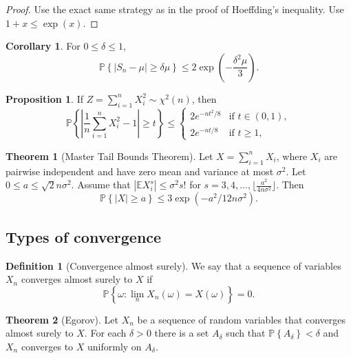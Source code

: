\documentclass{article}
\theoremstyle{definition}
\newtheorem{theorem}{Theorem}[section]
\newtheorem{definition}{Definition}[section]
\newtheorem{proposition}{Proposition}[section]
\newtheorem{corollary}{Corollary}[section]
\begin{document}
  \begin{proof}
    Use the exact same strategy as in the proof of Hoeffding's inequality. Use
    \( 1 + x \leq \exp\left(x\right)\).
  \end{proof}

  \begin{corollary}
    For \( 0 \leq \delta \leq 1 \),
    \[
      \mathbb{P}\left\{ \left| S_n - \mu \right| \geq \delta \mu
      \right\} \leq 2 \exp\left(- \frac{\delta^2 \mu}{3}\right).
    \]
  \end{corollary}

  \begin{proposition}
    If \( Z = \sum_{i=1}^{n} X_{i}^{2} \sim \chi^{2}(n) \), then
    \[
      \mathbb{P}\left\{ \left| \frac{1}{n} \sum_{i=1}^{n} X_{i}^{2} -
      1 \right| \ge t \right\}
      \le
      \begin{cases}
        2e^{-nt^{2}/8} & \text{if } t \in (0,1), \\
        2e^{-nt/8} & \text{if } t \ge 1,
      \end{cases}
    \]
  \end{proposition}

  \begin{theorem}[Master Tail Bounds Theorem]
    Let \( X = \sum_{i=1}^{n} X_i \), where \( X_i \) are pairwise
    independent and have zero mean and variance at most \( \sigma ^{2}
    \). Let \( 0 \leq a \leq \sqrt{2}n \sigma ^{2} \). Assume that \( |
    \mathbb{E}X ^{s} _{i} | \leq \sigma ^{2} s! \) for \( s = 3, 4,
    \dots , \lfloor \frac{a^2}{4n \sigma^2} \rfloor \).
    Then
    \[
      \mathbb{P}\left\{ | X | \geq a \right\} \leq 3 \exp\left(-a^2 /
      12n \sigma^2 \right).
    \]
  \end{theorem}

  \subsection{Types of convergence}

  \begin{definition}[Convergence almost surely]
    We say that a sequence of variables \( X_n \) converges almost
    surely to \( X \) if
    \[
      \mathbb{P}\left\{ \omega : \lim_{n} X_{n}(\omega) =
      X(\omega) \right\} = 0.
    \]
  \end{definition}

  \begin{theorem}[Egorov]
    Let \( X_n \) be a sequence of random variables that converges
    almost surely to \( X \). For each \( \delta > 0 \) there is a set
    \( A_{\delta} \) such that \( \mathbb{P}\left\{ A_{\delta} \right\}
    < \delta \) and \( X_n \) converges to \( X \) uniformly on \(
    A_{\delta} \).
  \end{theorem}
\end{document}
